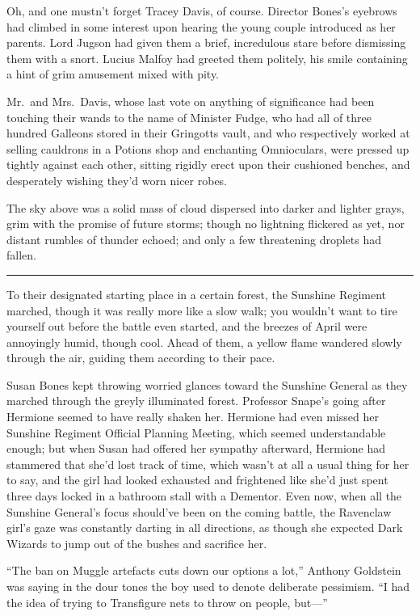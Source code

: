 Oh, and one mustn't forget Tracey Davis, of course. Director Bones's
eyebrows had climbed in some interest upon hearing the young couple
introduced as her parents. Lord Jugson had given them a brief,
incredulous stare before dismissing them with a snort. Lucius Malfoy had
greeted them politely, his smile containing a hint of grim amusement
mixed with pity.

Mr.~and Mrs.~Davis, whose last vote on anything of significance had been
touching their wands to the name of Minister Fudge, who had all of three
hundred Galleons stored in their Gringotts vault, and who respectively
worked at selling cauldrons in a Potions shop and enchanting
Omnioculars, were pressed up tightly against each other, sitting rigidly
erect upon their cushioned benches, and desperately wishing they'd worn
nicer robes.

The sky above was a solid mass of cloud dispersed into darker and
lighter grays, grim with the promise of future storms; though no
lightning flickered as yet, nor distant rumbles of thunder echoed; and
only a few threatening droplets had fallen.

\begin{center}\rule{3in}{0.4pt}\end{center}

To their designated starting place in a certain forest, the Sunshine
Regiment marched, though it was really more like a slow walk; you
wouldn't want to tire yourself out before the battle even started, and
the breezes of April were annoyingly humid, though cool. Ahead of them,
a yellow flame wandered slowly through the air, guiding them according
to their pace.

Susan Bones kept throwing worried glances toward the Sunshine General as
they marched through the greyly illuminated forest. Professor Snape's
going after Hermione seemed to have really shaken her. Hermione had even
missed her Sunshine Regiment Official Planning Meeting, which seemed
understandable enough; but when Susan had offered her sympathy
afterward, Hermione had stammered that she'd lost track of time, which
wasn't at all a usual thing for her to say, and the girl had looked
exhausted and frightened like she'd just spent three days locked in a
bathroom stall with a Dementor. Even now, when all the Sunshine
General's focus should've been on the coming battle, the Ravenclaw
girl's gaze was constantly darting in all directions, as though she
expected Dark Wizards to jump out of the bushes and sacrifice her.

``The ban on Muggle artefacts cuts down our options a lot,'' Anthony
Goldstein was saying in the dour tones the boy used to denote deliberate
pessimism. ``I had the idea of trying to Transfigure nets to throw on
people, but---''

